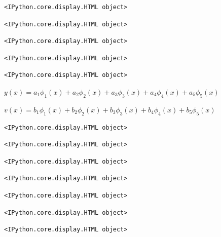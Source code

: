 \documentclass[
  11pt,
  a4paper,
]{scrbook}
\begin{document}
\begin{verbatim}
<IPython.core.display.HTML object>
\end{verbatim}

\begin{verbatim}
<IPython.core.display.HTML object>
\end{verbatim}

\begin{verbatim}
<IPython.core.display.HTML object>
\end{verbatim}

\begin{verbatim}
<IPython.core.display.HTML object>
\end{verbatim}

\begin{verbatim}
<IPython.core.display.HTML object>
\end{verbatim}

$\displaystyle y{\left(x \right)} = a_{1} \phi_{1}{\left(x \right)} + a_{2} \phi_{2}{\left(x \right)} + a_{3} \phi_{3}{\left(x \right)} + a_{4} \phi_{4}{\left(x \right)} + a_{5} \phi_{5}{\left(x \right)}$

$\displaystyle v{\left(x \right)} = b_{1} \phi_{1}{\left(x \right)} + b_{2} \phi_{2}{\left(x \right)} + b_{3} \phi_{3}{\left(x \right)} + b_{4} \phi_{4}{\left(x \right)} + b_{5} \phi_{5}{\left(x \right)}$

\begin{verbatim}
<IPython.core.display.HTML object>
\end{verbatim}

\begin{verbatim}
<IPython.core.display.HTML object>
\end{verbatim}

\begin{verbatim}
<IPython.core.display.HTML object>
\end{verbatim}

\begin{verbatim}
<IPython.core.display.HTML object>
\end{verbatim}

\begin{verbatim}
<IPython.core.display.HTML object>
\end{verbatim}

\begin{verbatim}
<IPython.core.display.HTML object>
\end{verbatim}

\begin{verbatim}
<IPython.core.display.HTML object>
\end{verbatim}
\end{document}
